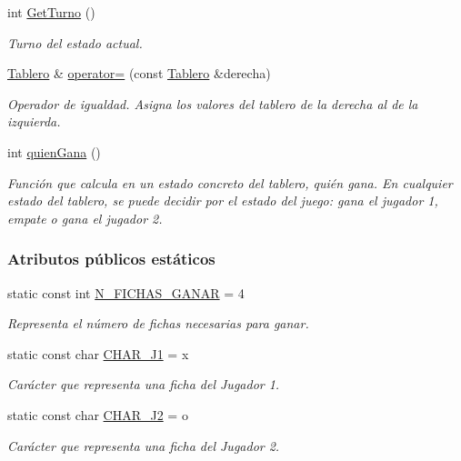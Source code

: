 \begin{DoxyCompactItemize}
int \hyperlink{classTablero_abf7a05a4b7463c1bd605d0b0a04add4f}{Get\+Turno} ()
\begin{DoxyCompactList}\small\item\em Turno del estado actual. \end{DoxyCompactList}\item 
\hyperlink{classTablero}{Tablero} \& \hyperlink{classTablero_abd7c6bb5bc26c0500308848399e1fd4f}{operator=} (const \hyperlink{classTablero}{Tablero} \&derecha)
\begin{DoxyCompactList}\small\item\em Operador de igualdad. Asigna los valores del tablero de la derecha al de la izquierda. \end{DoxyCompactList}\item 
int \hyperlink{classTablero_a5de543f8186142731ab3ac77944a11b1}{quien\+Gana} ()
\begin{DoxyCompactList}\small\item\em Función que calcula en un estado concreto del tablero, quién gana. En cualquier estado del tablero, se puede decidir por el estado del juego\+: gana el jugador 1, empate o gana el jugador 2. \end{DoxyCompactList}\end{DoxyCompactItemize}
\subsubsection*{Atributos públicos estáticos}
\begin{DoxyCompactItemize}
\item 
static const int \hyperlink{classTablero_aa38ed353bef45bd6c5a2e3aa4a897720}{N\+\_\+\+F\+I\+C\+H\+A\+S\+\_\+\+G\+A\+N\+AR} = 4
\begin{DoxyCompactList}\small\item\em Representa el número de fichas necesarias para ganar. \end{DoxyCompactList}\item 
static const char \hyperlink{classTablero_a5f3fdf5c4f76f9a7a6d6ad664b72ce44}{C\+H\+A\+R\+\_\+\+J1} = \textquotesingle{}x\textquotesingle{}
\begin{DoxyCompactList}\small\item\em Carácter que representa una ficha del Jugador 1. \end{DoxyCompactList}\item 
static const char \hyperlink{classTablero_afa16f5041be0f6cc7b0a55e502b89c53}{C\+H\+A\+R\+\_\+\+J2} = \textquotesingle{}o\textquotesingle{}
\begin{DoxyCompactList}\small\item\em Carácter que representa una ficha del Jugador 2. \end{DoxyCompactList}\end{DoxyCompactItemize}
